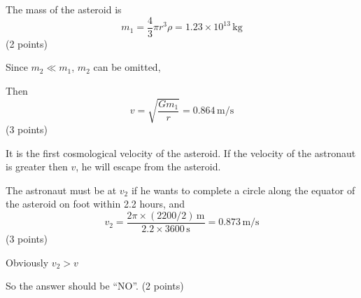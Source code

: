 The mass of the asteroid is
\[
  m_1 = \frac{4}{3}\pi r^3 \rho = 1.23\times 10^{13}\,\mathrm{kg}
\]
\hfill(2 points)

Since $m_2 \ll m_1$, $m_2$ can be omitted,

Then
\[
  v = \sqrt{\frac{Gm_1}{r}} = 0.864\,\mathrm{m/s}
\]
\hfill(3 points)

It is the first cosmological velocity of the asteroid.
If the velocity of the astronaut is greater then $v$, he will escape from the
asteroid.

The astronaut must be at $v_2$ if he wants to complete a circle along the
equator of the asteroid on foot within 2.2 hours, and
\[
  v_2 = \frac{2\pi\times(2200/2)\,\mathrm{m}}{2.2\times 3600\,\mathrm{s}}
      = 0.873\,\mathrm{m/s}
\]
\hfill(3 points)

Obviously $v_2 > v$

So the answer should be ``NO''. \hfill(2 points)
